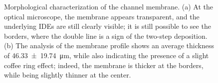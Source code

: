 \begin{figure}
    \centering
     \quad
    \caption{Morphological characterization of the channel membrane. 
    (a) At the optical microscope, the membrane appears transparent, and the underlying IDEs are still clearly visible; it is still possible to see the borders, where the double line is a sign of the two-step deposition. 
    (b) The analysis of the membrane profile shows an average thickness of \SI{46.33 \pm 19.74}{\um}, while also indicating the presence of a slight coffee ring effect; indeed, the membrane is thicker at the borders, while being slightly thinner at the center.}
    \label{fig:membrane}
\end{figure}
